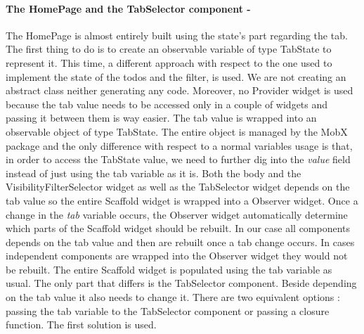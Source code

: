 \paragraph{The HomePage and the TabSelector component - }
\label{subpar:todo_app_bloc_core_state}The HomePage is almost entirely built using the state's part regarding the tab. The first thing to do is to create an observable variable of type TabState to represent it. This time, a different approach with respect to the one used to implement the state of the todos and the filter, is used. We are not creating an abstract class neither generating any code. Moreover, no Provider widget is used because the tab value needs to be accessed only in a couple of widgets and passing it between them is way easier. The tab value is wrapped into an observable object of type TabState. The entire object is managed by the MobX package and the only difference with respect to a normal variables usage is that, in order to access the TabState value, we need to further dig into the \textit{value} field instead of just using the tab variable as it is. Both the body and the VisibilityFilterSelector widget  as well as the TabSelector widget depends on the tab value so the entire Scaffold widget is wrapped into a Observer widget. Once a change in the \textit{tab} variable occurs, the Observer widget automatically determine which parts of the Scaffold widget should be rebuilt. In our case all components depends on the tab value and then are rebuilt once a tab change occurs. In cases independent components are wrapped into the Observer widget they would not be rebuilt. The entire Scaffold widget is populated using the tab variable as usual. The only part that differs is the TabSelector component. Beside depending on the tab value it also needs to change it. There are two equivalent options : passing the tab variable to the TabSelector component or passing a closure function. The first solution is used. 
